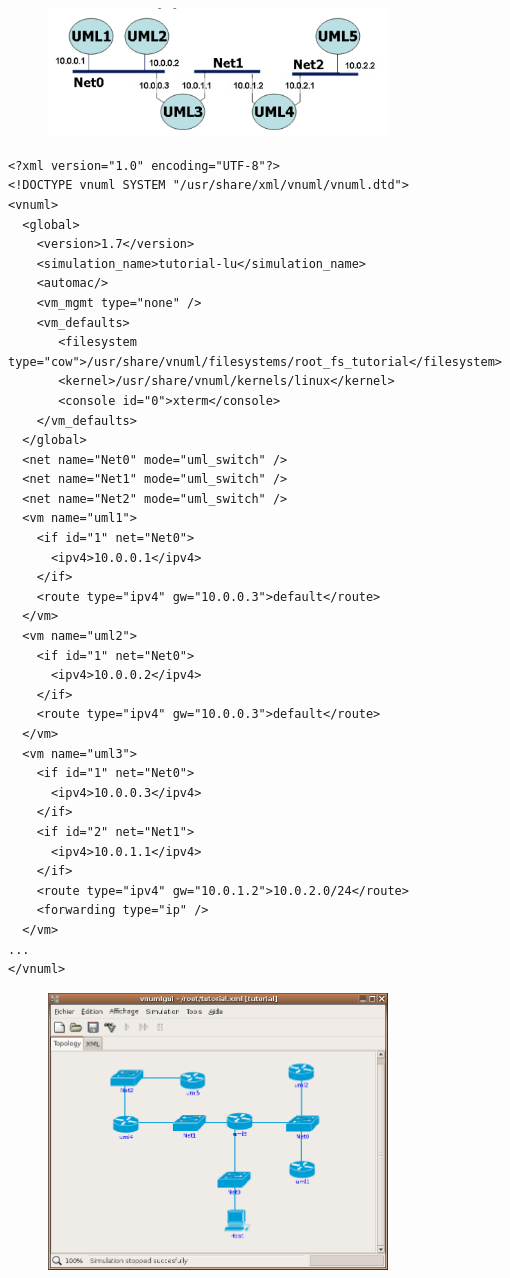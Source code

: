 \begin{figure}[!ht]
	\centering
	\includegraphics[width=9cm]{images/vnuml_01.png}
	\label{figura:vnuml_gui}
\end{figure}

\begin{scriptsize}
\begin{verbatim}
<?xml version="1.0" encoding="UTF-8"?>
<!DOCTYPE vnuml SYSTEM "/usr/share/xml/vnuml/vnuml.dtd">
<vnuml>
  <global>
    <version>1.7</version>
    <simulation_name>tutorial-lu</simulation_name>
    <automac/>
    <vm_mgmt type="none" />
    <vm_defaults>
       <filesystem type="cow">/usr/share/vnuml/filesystems/root_fs_tutorial</filesystem>
       <kernel>/usr/share/vnuml/kernels/linux</kernel>
       <console id="0">xterm</console>
    </vm_defaults>
  </global>
  <net name="Net0" mode="uml_switch" />
  <net name="Net1" mode="uml_switch" />
  <net name="Net2" mode="uml_switch" />
  <vm name="uml1">
    <if id="1" net="Net0">
      <ipv4>10.0.0.1</ipv4>
    </if>
    <route type="ipv4" gw="10.0.0.3">default</route>
  </vm>
  <vm name="uml2">
    <if id="1" net="Net0">
      <ipv4>10.0.0.2</ipv4>
    </if>
    <route type="ipv4" gw="10.0.0.3">default</route>
  </vm>
  <vm name="uml3">
    <if id="1" net="Net0">
      <ipv4>10.0.0.3</ipv4>
    </if>
    <if id="2" net="Net1">
      <ipv4>10.0.1.1</ipv4>
    </if>
    <route type="ipv4" gw="10.0.1.2">10.0.2.0/24</route>
    <forwarding type="ip" />
  </vm>
...
</vnuml>
\end{verbatim}
\end{scriptsize}

\begin{figure}[!ht]
	\centering
	\includegraphics[width=9cm]{images/vnumlgui.png}
	\label{figura:vnumlgui}
\end{figure}

